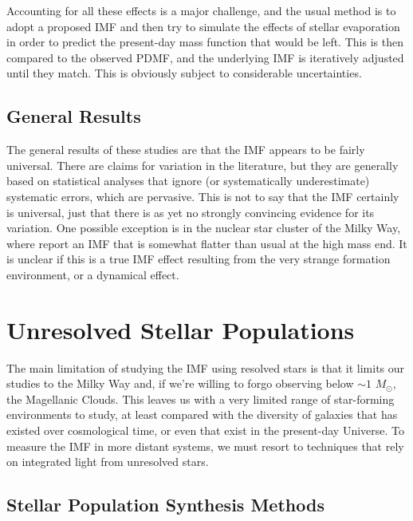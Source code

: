 Accounting for all these effects is a major challenge, and the usual method is to adopt a proposed IMF and then try to simulate the effects of stellar evaporation in order to predict the present-day mass function that would be left. This is then compared to the observed PDMF, and the underlying IMF is iteratively adjusted until they match. This is obviously subject to considerable uncertainties.

\subsection{General Results}

The general results of these studies are that the IMF appears to be fairly universal. There are claims for variation in the literature, but they are generally based on statistical analyses that ignore (or systematically underestimate) systematic errors, which are pervasive. This is not to say that the IMF certainly is universal, just that there is as yet no strongly convincing evidence for its variation. One possible exception is in the nuclear star cluster of the Milky Way, where \citet{lu13a} report an IMF that is somewhat flatter than usual at the high mass end. It is unclear if this is a true IMF effect resulting from the very strange formation environment, or a dynamical effect.


\section{Unresolved Stellar Populations}

The main limitation of studying the IMF using resolved stars is that it limits our studies to the Milky Way and, if we're willing to forgo observing below $\sim 1$ $M_\odot$, the Magellanic Clouds. This leaves us with a very limited range of star-forming environments to study, at least compared with the diversity of galaxies that has existed over cosmological time, or even that exist in the present-day Universe. To measure the IMF in more distant systems, we must resort to techniques that rely on integrated light from unresolved stars.

\subsection{Stellar Population Synthesis Methods}

